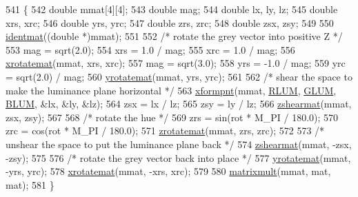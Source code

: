 \begin{DoxyCode}
541     \{
542       \textcolor{keywordtype}{double} mmat[4][4];
543       \textcolor{keywordtype}{double} mag;
544       \textcolor{keywordtype}{double} lx, ly, lz;
545       \textcolor{keywordtype}{double} xrs, xrc;
546       \textcolor{keywordtype}{double} yrs, yrc;
547       \textcolor{keywordtype}{double} zrs, zrc;
548       \textcolor{keywordtype}{double} zsx, zsy;
549 
550       \mbox{\hyperlink{classnjli_1_1_color_util_af683cd23fbe9098e277248be18047422}{identmat}}((\textcolor{keywordtype}{double} *)mmat);
551 
552       \textcolor{comment}{/* rotate the grey vector into positive Z */}
553       mag = sqrt(2.0);
554       xrs = 1.0 / mag;
555       xrc = 1.0 / mag;
556       \mbox{\hyperlink{classnjli_1_1_color_util_aa2f35809a653366ba6cfc11a34227af0}{xrotatemat}}(mmat, xrs, xrc);
557       mag = sqrt(3.0);
558       yrs = -1.0 / mag;
559       yrc = sqrt(2.0) / mag;
560       \mbox{\hyperlink{classnjli_1_1_color_util_ac37c7eb0af14d9171809c8a1cab9a834}{yrotatemat}}(mmat, yrs, yrc);
561 
562       \textcolor{comment}{/* shear the space to make the luminance plane horizontal */}
563       \mbox{\hyperlink{classnjli_1_1_color_util_a7db2133606fdf47afcbf7b8511a33dbe}{xformpnt}}(mmat, \mbox{\hyperlink{_color_util_8h_a463792f2fa66c99a8329aae43be4c7fd}{RLUM}}, \mbox{\hyperlink{_color_util_8h_a0faedcf9d84cbca5ee944af29148f6c1}{GLUM}}, \mbox{\hyperlink{_color_util_8h_af5ec63b487cb34b43575bb5bf7589513}{BLUM}}, &lx, &ly, &lz);
564       zsx = lx / lz;
565       zsy = ly / lz;
566       \mbox{\hyperlink{classnjli_1_1_color_util_a97183f17df4c96e96351e96c94fc587a}{zshearmat}}(mmat, zsx, zsy);
567 
568       \textcolor{comment}{/* rotate the hue */}
569       zrs = sin(rot * M\_PI / 180.0);
570       zrc = cos(rot * M\_PI / 180.0);
571       \mbox{\hyperlink{classnjli_1_1_color_util_ab43ec520ddd37266b3fb9a2e4f4a4ec3}{zrotatemat}}(mmat, zrs, zrc);
572 
573       \textcolor{comment}{/* unshear the space to put the luminance plane back */}
574       \mbox{\hyperlink{classnjli_1_1_color_util_a97183f17df4c96e96351e96c94fc587a}{zshearmat}}(mmat, -zsx, -zsy);
575 
576       \textcolor{comment}{/* rotate the grey vector back into place */}
577       \mbox{\hyperlink{classnjli_1_1_color_util_ac37c7eb0af14d9171809c8a1cab9a834}{yrotatemat}}(mmat, -yrs, yrc);
578       \mbox{\hyperlink{classnjli_1_1_color_util_aa2f35809a653366ba6cfc11a34227af0}{xrotatemat}}(mmat, -xrs, xrc);
579 
580       \mbox{\hyperlink{classnjli_1_1_color_util_a5cb3576c8177f303c88dc4e7283367c7}{matrixmult}}(mmat, mat, mat);
581     \}
\end{DoxyCode}
\mbox{\label{classnjli_1_1_color_util_af683cd23fbe9098e277248be18047422}} 
